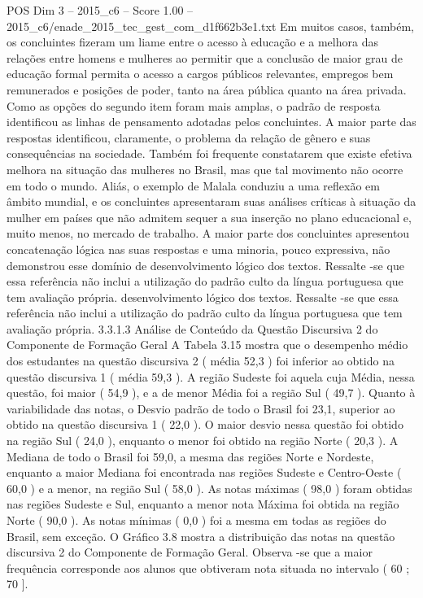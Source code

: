 \begin{textsample}{POS Dim 3 – 2015\_c6 – Score 1.00 – 2015\_c6/enade\_2015\_tec\_gest\_com\_d1f662b3e1.txt}
Em muitos casos, também, os concluintes fizeram um liame entre o acesso à educação e a melhora das relações entre homens e mulheres ao permitir que a conclusão de maior grau de educação formal permita o acesso a cargos públicos relevantes, empregos bem remunerados e posições de poder, tanto na área pública quanto na área privada.
Como as opções do segundo item foram mais amplas, o padrão de resposta identificou as linhas de pensamento adotadas pelos concluintes.
A maior parte das respostas identificou, claramente, o problema da relação de gênero e suas consequências na sociedade.
Também foi frequente constatarem que existe efetiva melhora na situação das mulheres no Brasil, mas que tal movimento não ocorre em todo o mundo.
Aliás, o exemplo de Malala conduziu a uma reflexão em âmbito mundial, e os concluintes apresentaram suas análises críticas à situação da mulher em países que não admitem sequer a sua inserção no plano educacional e, muito menos, no mercado de trabalho.
A maior parte dos concluintes apresentou concatenação lógica nas suas respostas e uma minoria, pouco expressiva, não demonstrou esse domínio de desenvolvimento lógico dos textos.
Ressalte -se que essa referência não inclui a utilização do padrão culto da língua portuguesa que tem avaliação própria. desenvolvimento lógico dos textos.
Ressalte -se que essa referência não inclui a utilização do padrão culto da língua portuguesa que tem avaliação própria. 3.3.1.3 Análise de Conteúdo da Questão Discursiva 2 do Componente de Formação Geral A Tabela 3.15 mostra que o desempenho médio dos estudantes na questão discursiva 2 ( média 52,3 ) foi inferior ao obtido na questão discursiva 1 ( média 59,3 ).
A região Sudeste foi aquela cuja Média, nessa questão, foi maior ( 54,9 ), e a de menor Média foi a região Sul ( 49,7 ).
Quanto à variabilidade das notas, o Desvio padrão de todo o Brasil foi 23,1, superior ao obtido na questão discursiva 1 ( 22,0 ).
O maior desvio nessa questão foi obtido na região Sul ( 24,0 ), enquanto o menor foi obtido na região Norte ( 20,3 ).
A Mediana de todo o Brasil foi 59,0, a mesma das regiões Norte e Nordeste, enquanto a maior Mediana foi encontrada nas regiões Sudeste e Centro-Oeste ( 60,0 ) e a menor, na região Sul ( 58,0 ).
As notas máximas ( 98,0 ) foram obtidas nas regiões Sudeste e Sul, enquanto a menor nota Máxima foi obtida na região Norte ( 90,0 ).
As notas mínimas ( 0,0 ) foi a mesma em todas as regiões do Brasil, sem exceção.
O Gráfico 3.8 mostra a distribuição das notas na questão discursiva 2 do Componente de Formação Geral.
Observa -se que a maior frequência corresponde aos alunos que obtiveram nota situada no intervalo ( 60 ; 70 ].

\end{textsample}
